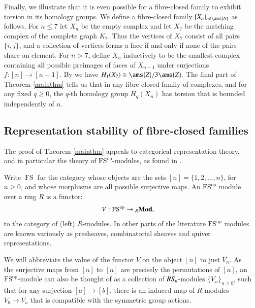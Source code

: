 \documentclass[matann2]{svjour1}
\newcommand{\FSop}{\operatorname{FS^{op}}}
\newcommand{\FS}{\operatorname{FS}}
\newcommand{\rmod}{\vrule width 0mm height 0 mm depth
  0mm_R\mathbf{Mod}}
\def\Z{\ams{Z}}
\def\N{\ams{N}}
\def\symn{S_{\kern-1pt n}}
\begin{document}
Finally, we illustrate that it is even possible
for a fibre-closed family to exhibit torsion in its homology groups.
We define a fibre-closed family $\{X_n\}_{n \in \N}$ as follows.
For $n \leq 7$ let $X_n$ be the empty complex and let $X_7$ be the
matching complex of the complete graph $K_7$. Thus the vertices of $X_7$
consist of all pairs $\{i,j\}$, and a collection of vertices
forms a face if and only if none of the pairs share an element.
For $n > 7$, define $X_n$ inductively to be the smallest complex
containing all possible preimages of faces of $X_{n-1}$ under
surjections $f:[n] \rightarrow [n-1]$. By \cites{MR1253009,SW} we have
$H_1(X_7) \cong \Z/3\Z.$  The final part of Theorem \ref{mainthm}
tells us that in any fibre closed family of complexes, and for any
fixed $q \geq  0$, the $q$-th homology group $H_q(X_n)$
has torsion that is bounded independently of $n$.

\subsection{Representation stability of fibre-closed families}

The proof of Theorem \ref{mainthm} appeals to categorical representation
theory, and in particular the theory of $\FSop$-modules,
as found in \cites{PR-resonance,fs-braid,sam,Tost1,Tost2}.

Write $\FS$ for the category whose objects are the sets
$[n]=\{1,2,\ldots,n\}$, for $n \geq 0$,
and whose morphisms are all possible surjective maps.
An $\FSop$ module over a ring $R$ is a functor:
$$
V:\FSop \rightarrow\rmod,
$$
to the category of (left) $R$-modules. In other parts
of the literature
$\FSop$ modules are known variously
as presheaves, combinatorial sheaves and quiver representations. 

We will abbreviate the value of the functor $V$ on the object $[n]$
to just $V_n$. As
the surjective maps from $[n]$ to $[n]$ are
precisely the permutations of $[n]$,
an $\FSop$-module can also be thought of as a
collection of $R\symn$-modules $\{V_n\}_{n \geq 0}$,
such that for any surjection $[a] \rightarrow [b]$, there is
an induced map of $R$-modules $V_b \rightarrow V_a$ that
is compatible with the symmetric group actions.
\end{document}
